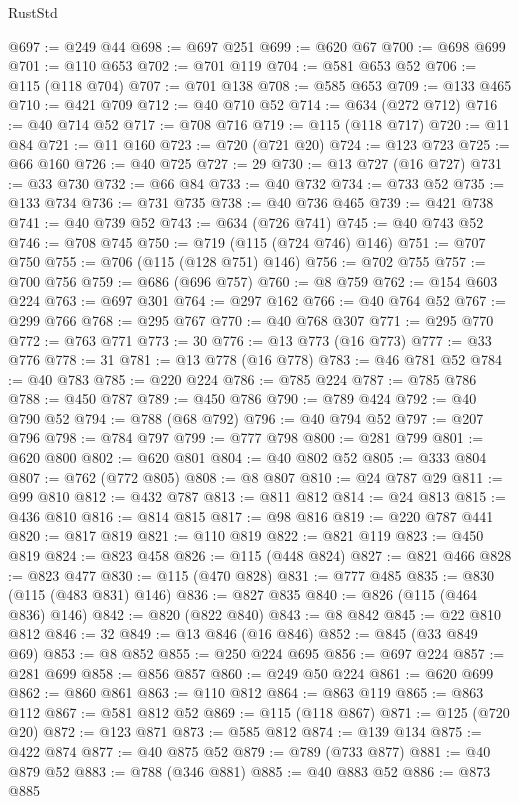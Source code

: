 \begin{lexlean}{RustStd}
\begin{coremodule}
{\begin{coremodule}
{{{{{{{{{{{{{{{{{{{{{{{{{{{{{{{{{{{{{{@697 := @249 @44
@698 := @697 @251
@699 := @620 @67
@700 := @698 @699
@701 := @110 @653
@702 := @701 @119
@704 := @581 @653 @52
@706 := @115 (@118 @704)
@707 := @701 @138
@708 := @585 @653
@709 := @133 @465
@710 := @421 @709
@712 := @40 @710 @52
@714 := @634 (@272 @712)
@716 := @40 @714 @52
@717 := @708 @716
@719 := @115 (@118 @717)
@720 := @11 @84
@721 := @11 @160
@723 := @720 (@721 @20)
@724 := @123 @723
@725 := @66 @160
@726 := @40 @725
@727 := 29
@730 := @13 @727 (@16 @727)
@731 := @33 @730
@732 := @66 @84
@733 := @40 @732
@734 := @733 @52
@735 := @133 @734
@736 := @731 @735
@738 := @40 @736 @465
@739 := @421 @738
@741 := @40 @739 @52
@743 := @634 (@726 @741)
@745 := @40 @743 @52
@746 := @708 @745
@750 := @719 (@115 (@724 @746) @146)
@751 := @707 @750
@755 := @706 (@115 (@128 @751) @146)
@756 := @702 @755
@757 := @700 @756
@759 := @686 (@696 @757)
@760 := @8 @759
@762 := @154 @603 @224
@763 := @697 @301
@764 := @297 @162
@766 := @40 @764 @52
@767 := @299 @766
@768 := @295 @767
@770 := @40 @768 @307
@771 := @295 @770
@772 := @763 @771
@773 := 30
@776 := @13 @773 (@16 @773)
@777 := @33 @776
@778 := 31
@781 := @13 @778 (@16 @778)
@783 := @46 @781 @52
@784 := @40 @783
@785 := @220 @224
@786 := @785 @224
@787 := @785 @786
@788 := @450 @787
@789 := @450 @786
@790 := @789 @424
@792 := @40 @790 @52
@794 := @788 (@68 @792)
@796 := @40 @794 @52
@797 := @207 @796
@798 := @784 @797
@799 := @777 @798
@800 := @281 @799
@801 := @620 @800
@802 := @620 @801
@804 := @40 @802 @52
@805 := @333 @804
@807 := @762 (@772 @805)
@808 := @8 @807
@810 := @24 @787 @29
@811 := @99 @810
@812 := @432 @787
@813 := @811 @812
@814 := @24 @813
@815 := @436 @810
@816 := @814 @815
@817 := @98 @816
@819 := @220 @787 @441
@820 := @817 @819
@821 := @110 @819
@822 := @821 @119
@823 := @450 @819
@824 := @823 @458
@826 := @115 (@448 @824)
@827 := @821 @466
@828 := @823 @477
@830 := @115 (@470 @828)
@831 := @777 @485
@835 := @830 (@115 (@483 @831) @146)
@836 := @827 @835
@840 := @826 (@115 (@464 @836) @146)
@842 := @820 (@822 @840)
@843 := @8 @842
@845 := @22 @810 @812
@846 := 32
@849 := @13 @846 (@16 @846)
@852 := @845 (@33 @849 @69)
@853 := @8 @852
@855 := @250 @224 @695
@856 := @697 @224
@857 := @281 @699
@858 := @856 @857
@860 := @249 @50 @224
@861 := @620 @699
@862 := @860 @861
@863 := @110 @812
@864 := @863 @119
@865 := @863 @112
@867 := @581 @812 @52
@869 := @115 (@118 @867)
@871 := @125 (@720 @20)
@872 := @123 @871
@873 := @585 @812
@874 := @139 @134
@875 := @422 @874
@877 := @40 @875 @52
@879 := @789 (@733 @877)
@881 := @40 @879 @52
@883 := @788 (@346 @881)
@885 := @40 @883 @52
@886 := @873 @885
}}}}}}}}}}}}}}}}}}}}}}}}}}}}}}}}}}}}}}
\end{coremodule}}
\end{coremodule}
\end{lexlean}
